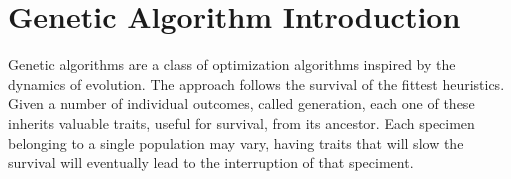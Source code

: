 \documentclass{article}
\begin{document}
\section{Genetic Algorithm Introduction}
Genetic algorithms are a class of optimization algorithms inspired by the 
dynamics of evolution. The approach follows the survival of the fittest heuristics.
Given a number of individual outcomes, called generation, each one of these inherits 
valuable traits, useful for survival, from its ancestor. Each specimen belonging to a
single population may vary, having traits that will slow the survival will eventually
lead to the interruption of that speciment.  


\printbibliography[title = {Bibliography}]
\end{document}

